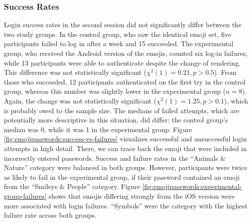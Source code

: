 \subsubsection{Success Rates}
Login success rates in the second session did not significantly differ between the two study groups. In the control group, who saw the identical emoji set, five participants failed to log in after a week and 15 succeeded. The experimental group, who received the Android version of the emojis, counted six log-in failures, while 13 participants were able to authenticate despite the change of rendering. This difference was not statistically significant ($\chi^2(1)=0.21, p>0.5$). From those who succeeded, 12 participants authenticated on the first try in the control group, whereas this number was slightly lower in the experimental group ($n=8$). Again, the change was not statistically significant ($\chi^2(1)=1.25, p>0.1$), which is probably owed to the sample size. The medians of failed attempts, which are potentially more descriptive in this situation, did differ: the control group's median was 0, while it was 1 in the experimental group. Figure \ref{fig:emojipasswords:success-vs-failures} visualizes successful and unsuccessful login attempts in high detail. There, we can trace back the emoji that were included in incorrectly entered passwords. Success and failure rates in the ``Animals \& Nature'' category were balanced in both groups. However, participants were twice as likely to fail in the experimental group, if their password contained an emoji from the ``Smileys \& People'' category. Figure \ref{fig:emojipasswords:experimental-group-failures} shows that emojis differing strongly from the iOS version were more associated with login failures. ``Symbols'' were the category with the highest failure rate across both groups.


